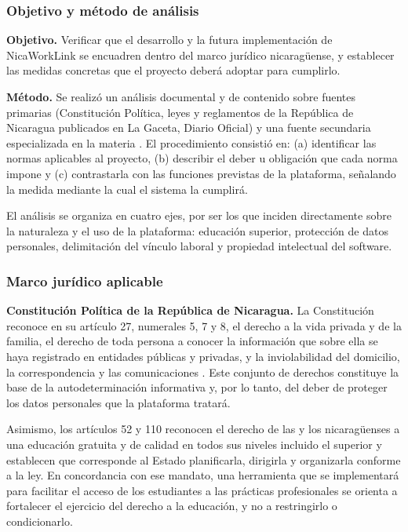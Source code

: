 \subsubsection{Objetivo y método de análisis}

\textbf{Objetivo.} Verificar que el desarrollo y la futura implementación de NicaWorkLink se encuadren dentro del marco jurídico nicaragüense, y establecer las medidas concretas que el proyecto deberá adoptar para cumplirlo.

\textbf{Método.} Se realizó un análisis documental y de contenido sobre fuentes primarias (Constitución Política, leyes y reglamentos de la República de Nicaragua publicados en La Gaceta, Diario Oficial) y una fuente secundaria especializada en la materia \parencite{lopezcarballo}. El procedimiento consistió en: (a) identificar las normas aplicables al proyecto, (b) describir el deber u obligación que cada norma impone y (c) contrastarla con las funciones previstas de la plataforma, señalando la medida mediante la cual el sistema la cumplirá.

El análisis se organiza en cuatro ejes, por ser los que inciden directamente sobre la naturaleza y el uso de la plataforma: educación superior, protección de datos personales, delimitación del vínculo laboral y propiedad intelectual del software.

\subsubsection{Marco jurídico aplicable}

\textbf{Constitución Política de la República de Nicaragua.} La Constitución reconoce en su artículo 27, numerales 5, 7 y 8, el derecho a la vida privada y de la familia, el derecho de toda persona a conocer la información que sobre ella se haya registrado en entidades públicas y privadas, y la inviolabilidad del domicilio, la correspondencia y las comunicaciones \parencite{constitucion1987}. Este conjunto de derechos constituye la base de la autodeterminación informativa y, por lo tanto, del deber de proteger los datos personales que la plataforma tratará.

Asimismo, los artículos 52 y 110 reconocen el derecho de las y los nicaragüenses a una educación gratuita y de calidad en todos sus niveles incluido el superior y establecen que corresponde al Estado planificarla, dirigirla y organizarla conforme a la ley. En concordancia con ese mandato, una herramienta que se implementará para facilitar el acceso de los estudiantes a las prácticas profesionales se orienta a fortalecer el ejercicio del derecho a la educación, y no a restringirlo o condicionarlo.

